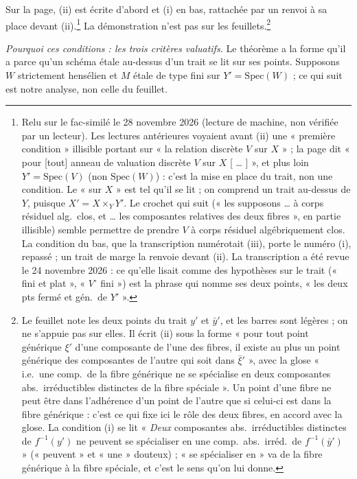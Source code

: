 \documentclass[11pt,a4paper]{article}
\begin{document}
Sur la page, (ii) est écrite d'abord et (i) en bas, rattachée par un renvoi
à sa place devant (ii).\footnote{Relu sur le fac-similé le 28 novembre 2026
(lecture de machine, non vérifiée par un lecteur). Les lectures antérieures
voyaient avant (ii) une « première condition » illisible portant sur « la
relation discrète $V$ sur $X$ » ; la page dit « pour [tout] anneau de
valuation discrète $V$ sur $X$ [ … ] », et plus loin $Y' = \mathrm{Spec}(V)$
(non $\mathrm{Spec}(W)$) : c'est la mise en place du trait, non une
condition. Le « sur $X$ » est tel qu'il se lit ; on comprend un trait
au-dessus de $Y$, puisque $X' = X \times_Y Y'$. Le crochet qui suit (« les
supposons … à corps résiduel alg.\ clos, et … les composantes relatives des
deux fibres », en partie illisible) semble permettre de prendre $V$ à corps
résiduel algébriquement clos. La condition du bas, que la transcription
numérotait (iii), porte le numéro (i), repassé ; un trait de marge la renvoie
devant (ii). La transcription a été revue le 24 novembre 2026 : ce qu'elle
lisait comme des hypothèses sur le trait (« fini et plat », « $V^{\circ}$
fini ») est la phrase qui nomme ses deux points, « les deux pts fermé et gén.\
de $Y'$ ».} La démonstration n'est pas sur les feuillets.\footnote{Le feuillet
note les deux points du trait $y'$ et $\bar{y}'$, et les barres sont légères ;
on ne s'appuie pas sur elles. Il écrit (ii) sous la forme « pour tout point
générique $\xi'$ d'une composante de l'une des fibres, il existe au plus un
point générique des composantes de l'autre qui soit dans $\bar{\xi}'$ », avec
la glose « i.e.\ une comp.\ de la fibre générique ne se spécialise en deux
composantes abs.\ irréductibles distinctes de la fibre spéciale ». Un point
d'une fibre ne peut être dans l'adhérence d'un point de l'autre que si celui-ci
est dans la fibre générique : c'est ce qui fixe ici le rôle des deux fibres, en
accord avec la glose. La condition (i) se lit « \emph{Deux} composantes abs.\
irréductibles distinctes de $f^{-1}(y')$ ne peuvent se spécialiser en une
comp.\ abs.\ irréd.\ de $f^{-1}(\bar{y}')$ » (« peuvent » et « une »
douteux) ; « se spécialiser en » va de la fibre générique à la fibre
spéciale, et c'est le sens qu'on lui donne.}

\emph{Pourquoi ces conditions : les trois critères valuatifs.} Le théorème a la
forme qu'il a parce qu'un schéma étale au-dessus d'un trait se lit sur ses
points. Supposons $W$ strictement hensélien et $M$ étale de type fini sur
$Y' = \mathrm{Spec}(W)$ ; ce qui suit est notre analyse, non celle du
feuillet.
\end{document}
